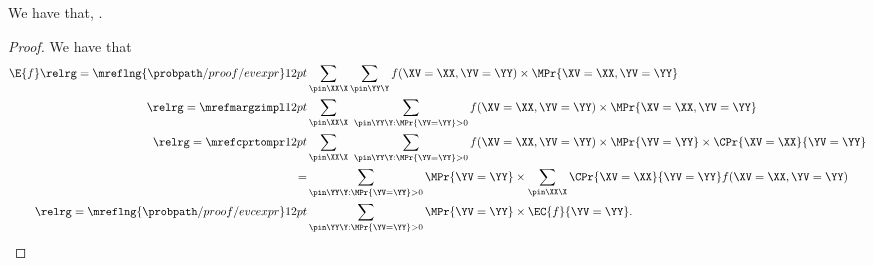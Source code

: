 \begin{proposition}
  We have that, \evctoevexprprop.%
\end{proposition}

\begin{proof}
  We have that
  \begin{align*}
    \E{f} \relrg = {\mreflng{\probpath/proof/evexpr}} 12pt &
    \sum_{\pin\XX\X}\sum_{\pin\YY\Y}f(\XV = \XX,\YV = \YY)\times \MPr{\XV = \XX,\YV = \YY}\\
    \relrg = {\mrefmargzimpl} 12pt &
    \sum_{\pin\XX\X}\ \sum_{\pin\YY\Y : \MPr{\YV = \YY} > 0}f(\XV = \XX,\YV = \YY)\times \MPr{\XV = \XX,\YV = \YY}\\
    \relrg = {\mrefcprtompr} 12pt &
        \sum_{\pin\XX\X}\ \sum_{\pin\YY\Y : \MPr{\YV = \YY} > 0}f(\XV = \XX,\YV = \YY)\times \MPr{\YV = \YY}\times \CPr{\XV = \XX}{\YV = \YY}\\
      = &
        \sum_{\pin\YY\Y : \MPr{\YV = \YY} > 0}\MPr{\YV = \YY}\times \sum_{\pin\XX\X}\CPr{\XV = \XX}{\YV = \YY}f(\XV = \XX,\YV = \YY)\\
      \relrg = {\mreflng{\probpath/proof/evcexpr}} 12pt &
    \sum_{\pin\YY\Y : \MPr{\YV = \YY} > 0}\MPr{\YV = \YY} \times \EC{f}{\YV = \YY}.
  \end{align*}
\end{proof}
